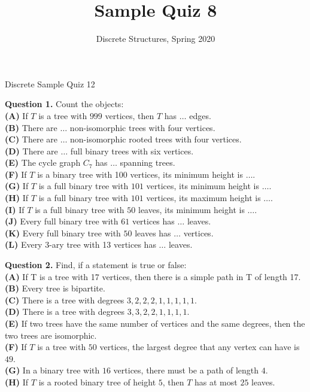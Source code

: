 \documentclass[jou]{apa6}
\title{Sample Quiz 8}
\author{Discrete Structures, Spring 2020}
\affiliation{RBS}
\begin{document}
\thispagestyle{empty}

\twocolumn
{\Large Discrete Sample Quiz 12}

{\bf Question 1.} Count the objects:\\
{\bf (A)} If $T$ is a tree with $999$ vertices, then $T$ has $\ldots$ edges.\\
{\bf (B)} There are $\ldots$ non-isomorphic trees with four vertices.\\
{\bf (C)} There are $\ldots$ non-isomorphic rooted trees with four vertices.\\
{\bf (D)} There are $\ldots$ full binary trees with six vertices.\\
{\bf (E)} The cycle graph $C_7$ has $\ldots$ spanning trees.\\
{\bf (F)} If $T$ is a binary tree with 100 vertices, its minimum height is $\ldots$.\\
{\bf (G)} If $T$ is a full binary tree with $101$ vertices, its minimum height is $\ldots$.\\
{\bf (H)} If $T$ is a full binary tree with $101$ vertices, its maximum height is $\ldots$.\\
{\bf (I)} If $T$ is a full binary tree with $50$ leaves, its minimum height is $\ldots$.\\
{\bf (J)} Every full binary tree with $61$ vertices has $\ldots$ leaves.\\
{\bf (K)} Every full binary tree with $50$ leaves has $\ldots$ vertices.\\
{\bf (L)} Every 3-ary tree with 13 vertices has $\ldots$ leaves.

\vspace{10pt}
{\bf Question 2.} Find, if a statement is true or false:\\
{\bf (A)} If T is a tree with 17 vertices, then there is a simple path in T of length 17.\\
{\bf (B)} Every tree is bipartite.\\
{\bf (C)} There is a tree with degrees $3, 2, 2, 2, 1, 1, 1, 1, 1$.\\
{\bf (D)} There is a tree with degrees $3, 3, 2, 2, 1, 1, 1, 1$.\\
{\bf (E)} If two trees have the same number of vertices and the same degrees, then the two trees are isomorphic.\\
{\bf (F)} If $T$ is a tree with $50$ vertices, the largest degree that any vertex can have is $49$.\\
{\bf (G)} In a binary tree with $16$ vertices, there must be a path of length $4$.\\
{\bf (H)} If $T$ is a rooted binary tree of height $5$, then $T$ has at most $25$ leaves.
\end{document}

